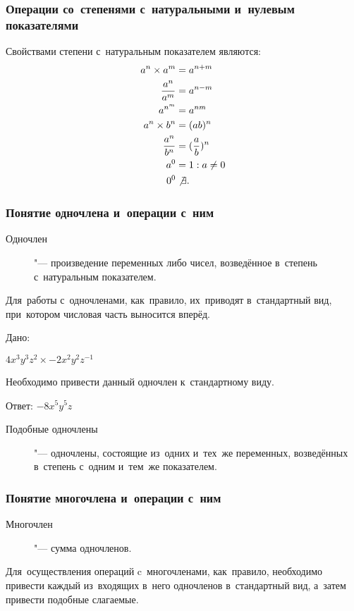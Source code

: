 \documentclass[]{scrartcl}
\begin{document}
\subsubsection{Операции со~степенями с~натуральными и~нулевым показателями}

Свойствами степени с~натуральным показателем являются:
\begin{equation}\label{eq:nat-degrees-prop-1}
	\begin{aligned}
	a^n \times a^m &= a^{n+m} \\
	\frac{a^n}{a^m} &=a^{n-m} \\
	a^{n^{m}} &= a^{nm} \\
	a^n \times b^n &= (ab)^n \\
	\frac{a^n}{b^n} &= (\frac{a}{b})^n \\
	a^0 &= 1: a \neq 0 \\
	0^0 &\not\exists.
	\end{aligned}
\end{equation}




\subsubsection{Понятие одночлена и~операции с~ним}
\begin{description}
	\item[Одночлен] "--- произведение переменных либо чисел, возведённое в~степень с~натуральным показателем.
\end{description}
Для~работы с~одночленами, как~правило, их~приводят в~стандартный вид, при~котором числовая часть выносится вперёд.
\begin{Thexmpl}\label{ex:monomial-1}
	Дано:
	
	$4x^{3}y^{3}z^{2} \times -2x^{2}y^{2}z^{-1}$
	
	Необходимо привести данный одночлен к~стандартному виду.
	
	Ответ: $-8x^{5}y^{5}z$
\end{Thexmpl}

\begin{description}
	\item[Подобные одночлены] "--- одночлены, состоящие из~одних и~тех~же переменных, возведённых в~степень с~одним и~тем~же показателем.
\end{description}

\subsubsection{Понятие многочлена и~операции с~ним}
\begin{description}
	\item[Многочлен] "--- сумма одночленов.
\end{description}
Для~осуществления операций c~многочленами, как~правило, необходимо привести каждый из~входящих в~него одночленов в~стандартный вид, а~затем привести подобные слагаемые.
\end{document}
